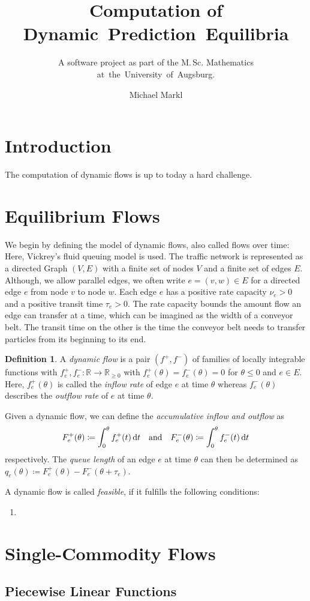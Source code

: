 \documentclass[titlepage]{scrartcl}
\author{Michael Markl}
\title{Computation of Dynamic~Prediction~Equilibria}
\subtitle{A software project as part of the M.\,Sc. Mathematics at~the~University~of~Augsburg.}
\theoremstyle{definition}
\newtheorem{definition}[theorem]{Definition}
\newcommand{\R}{\mathbb{R}}
\newcommand{\diff}{\,\textnormal{d}}
\newcommand{\capa}{\nu}
\newcommand{\transit}{\tau}
\newcommand{\infl}[1][f]{{#1}^+}
\newcommand{\outfl}[1][f]{{#1}^-}
\newcommand{\qulen}{q}
\begin{document}
    \maketitle

    \newpage
    \tableofcontents

    \newpage
    \section{Introduction}

    The computation of dynamic flows is up to today a hard challenge.

    \newpage
    \section{Equilibrium Flows}

    We begin by defining the model of dynamic flows, also called flows over time: Here, Vickrey's fluid queuing model is used. 
    The traffic network is represented as a directed Graph $(V, E)$ with a finite set of nodes $V$ and a finite set of edges $E$.
    Although, we allow parallel edges, we often write $e=(v,w)\in E$ for a directed edge $e$ from node $v$ to node $w$.
    Each edge $e$ has a positive rate capacity $\capa_e > 0$ and a positive transit time $\transit_e > 0$.
    The rate capacity bounds the amount flow an edge can transfer at a time, which can be imagined as the width of a conveyor belt.
    The transit time on the other is the time the conveyor belt needs to transfer particles from its beginning to its end.


    
    \begin{definition}
        A \emph{dynamic flow} is a pair $(\infl, \outfl)$ of families of locally integrable functions with $\infl_e, \outfl_e : \R \rightarrow \R_{\geq 0}$ with $\infl_e(\theta) = \outfl_e(\theta) = 0$ for $\theta \leq 0$ and  $e\in E$.
        Here, $\infl_e(\theta)$ is called the \emph{inflow rate} of edge $e$ at time $\theta$ whereas $\outfl_e(\theta)$ describes the \emph{outflow rate} of $e$ at time $\theta$.

        Given a dynamic flow, we can define the \emph{accumulative inflow and outflow} as
        \[
            F^+_e(\theta) \coloneqq \int_0^\theta \infl_e(t) \diff t \quad\text{and}\quad  F^-_e(\theta) \coloneqq \int_0^\theta \outfl_e(t) \diff t 
        \]
        respectively.
        The \emph{queue length} of an edge $e$ at time $\theta$ can then be determined as $\qulen_e(\theta) \coloneqq F^+_e(\theta) - F^-_e(\theta + \transit_e)$.
        

        A dynamic flow is called \emph{feasible}, if it fulfills the following conditions:
        \begin{enumerate}
            \item 
        \end{enumerate}
        
    \end{definition}
        

    \newpage
    \section{Single-Commodity Flows}

    \subsection{Piecewise Linear Functions}
\end{document}
